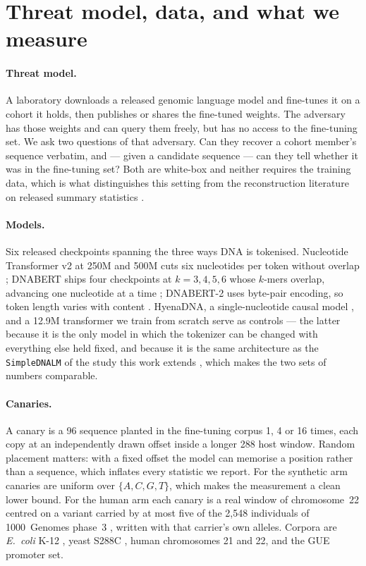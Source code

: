 \section{Threat model, data, and what we measure}
\label{sec:measure}

\paragraph{Threat model.}
A laboratory downloads a released genomic language model and fine-tunes it on a cohort it holds, then
publishes or shares the fine-tuned weights. The adversary has those weights and can query them
freely, but has no access to the fine-tuning set. We ask two questions of that adversary. Can they
recover a cohort member's sequence verbatim, and --- given a candidate sequence --- can they tell
whether it was in the fine-tuning set? Both are white-box and neither requires the training data,
which is what distinguishes this setting from the reconstruction literature on released
summary statistics \citep{li2013membership,tramer2015bounded}.

\paragraph{Models.}
Six released checkpoints spanning the three ways DNA is tokenised. Nucleotide Transformer v2 at 250M
and 500M cuts six nucleotides per token without overlap \citep{dalla2024nucleotide}; DNABERT ships
four checkpoints at $k=3,4,5,6$ whose $k$-mers overlap, advancing one nucleotide at a time
\citep{ji2021dnabert}; DNABERT-2 uses byte-pair encoding, so token length varies with content
\citep{zhou2024dnabert2}. HyenaDNA, a single-nucleotide causal model \citep{nguyen2023hyenadna}, and
a 12.9M transformer we train from scratch serve as controls --- the latter because it is the only
model in which the tokenizer can be changed with everything else held fixed, and because it is the
same architecture as the \texttt{SimpleDNALM} of the study this work extends
\citep{nemecek2026quantifying}, which makes the two sets of numbers comparable.

\paragraph{Canaries.}
A canary is a 96\nt{} sequence planted in the fine-tuning corpus 1, 4 or 16 times, each copy at an
independently drawn offset inside a longer 288\nt{} host window. Random placement matters: with a
fixed offset the model can memorise a position rather than a sequence, which inflates every
statistic we report. For the synthetic arm canaries are uniform over $\{A,C,G,T\}$, which makes the
measurement a clean lower bound. For the human arm each canary is a real window of chromosome~22
centred on a variant carried by at most five of the 2{,}548 individuals of 1000~Genomes phase~3
\citep{thousandgenomes2015}, written with that carrier's own alleles. Corpora are \emph{E.~coli}
K-12 \citep{blattner1997ecoli}, yeast S288C \citep{engel2014yeast}, human chromosomes 21 and 22, and
the GUE promoter set.

